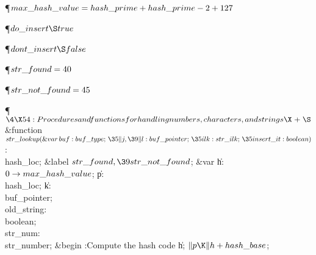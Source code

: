 \Y\P\D {}$\\{max\_hash\_value}=\\{hash\_prime}+\\{hash\_prime}-2+127$\par
\P\D {}$\\{do\_insert}\S\\{true}$%
\par
\P\D {}$\\{dont\_insert}\S\\{false}$\Y\par
\P\D {}$\\{str\_found}=40$\par
\P\D {}$\\{str\_not\_found}=45$\par
\Y\P$\4\X54:Procedures and functions for handling numbers, characters, and
strings\X\mathrel{+}\S$\6
\4\&{function}\1\  $\\{str\_lookup}(\mathop{\&{var}}\\{buf}:\\{buf\_type};\,%
\35\|j,\39\|l:\\{buf\_pointer};\,\35\\{ilk}:\\{str\_ilk};\,\35\\{insert\_it}:%
\\{boolean})$: \\{hash\_loc};\6
\4\&{label} $\\{str\_found},\39\\{str\_not\_found}$;\6
\4\&{var} \|h: $0\to\\{max\_hash\_value}$;\6
\|p: \\{hash\_loc};\6
\|k: \\{buf\_pointer};\6
\\{old\_string}: \\{boolean};\6
\\{str\_num}: \\{str\_number};\2%
\6
\&{begin} :Compute the hash code \|h\X;\6
$\|p\K\|h+\\{hash\_base}$;\6
